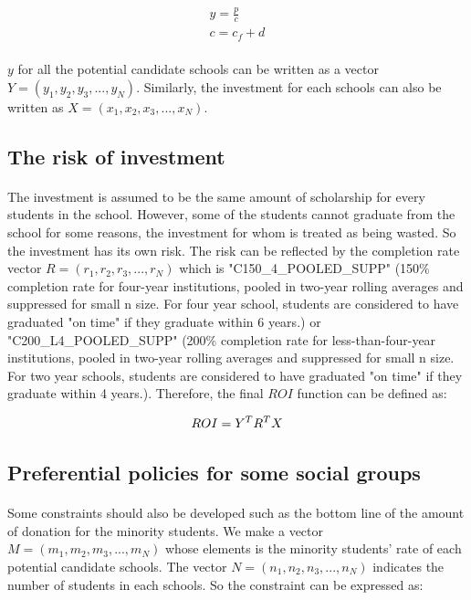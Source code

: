 \documentclass{mcmthesis}
\begin{document}
\begin{align}
y=\frac{p}{c}\\
c=c_f+d
\end{align}

\paragraph{} $y$ for all the potential candidate schools can be written as a vector $Y=(y_1, y_2, y_3, ..., y_N)$. Similarly, the investment for each schools can also be written as $X=(x_1, x_2, x_3, ..., x_N)$.

\subsection{The risk of investment}
\paragraph{} The investment is assumed to be the same amount of scholarship for every students in the school. However, some of the students cannot graduate from  the school for some reasons, the investment for whom is treated as being wasted. So the investment has its own risk. The risk can be reflected by the completion rate vector $R=(r_1, r_2, r_3, ..., r_N)$ which is "C150\_4\_POOLED\_SUPP" (150\% completion rate for four-year institutions, pooled in two-year rolling averages and suppressed for small n size.  For four year school, students are considered to have graduated "on time" if they graduate within 6 years.) or "C200\_L4\_POOLED\_SUPP" (200\% completion rate for less-than-four-year institutions, pooled in two-year rolling averages and suppressed for small n size.  For two year schools, students are considered to have graduated "on time" if they graduate within 4 years.). Therefore, the final $ROI$ function can be defined as:

\begin{align}
ROI=Y^T\*R^T\*X
\end{align}

\subsection{Preferential policies for some social groups}  
\paragraph{} Some constraints should also be developed such as the bottom line of the amount of donation for the minority students. We make a vector $M=(m_1, m_2, m_3, ..., m_N)$ whose elements is the minority students' rate of each potential candidate schools. The vector $N=(n_1, n_2, n_3, ..., n_N)$ indicates the number of students in each schools. So the constraint can be expressed as:
 
\end{document}
